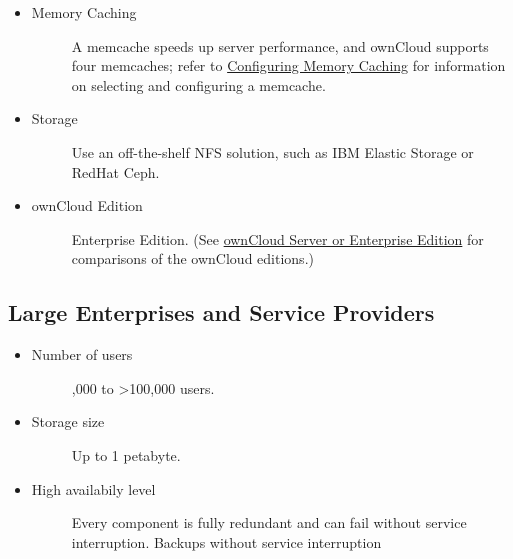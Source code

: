 \documentclass[letterpaper,10pt,english]{sphinxmanual}
\begin{document}
\begin{itemize}
\begin{description}
\end{description}

\item {} \begin{description}
\item[{Memory Caching}] \leavevmode
A memcache speeds up server performance, and ownCloud supports four
memcaches; refer to \href{https://doc.owncloud.org/server/9.0/admin\_manual/configuration\_server/caching\_configuration.html}{Configuring Memory Caching} for information on
selecting and configuring a memcache.

\end{description}

\item {} \begin{description}
\item[{Storage}] \leavevmode
Use an off-the-shelf NFS solution, such as IBM Elastic Storage or RedHat
Ceph.

\end{description}

\item {} \begin{description}
\item[{ownCloud Edition}] \leavevmode
Enterprise Edition. (See \href{https://owncloud.com/owncloud-server-or-enterprise-edition/}{ownCloud Server or Enterprise Edition} for
comparisons of the ownCloud editions.)

\end{description}

\end{itemize}


\subsection{Large Enterprises and Service Providers}
\label{installation/deployment_recommendations:large-enterprises-and-service-providers}\begin{itemize}
\item {} \begin{description}
\item[{Number of users}] ,000 to \textgreater{}100,000 users.

\end{description}

\item {} \begin{description}
\item[{Storage size}] \leavevmode
Up to 1 petabyte.

\end{description}

\item {} \begin{description}
\item[{High availabily level}] \leavevmode
Every component is fully redundant and can fail without service interruption.
Backups without service interruption

\end{description}

\end{itemize}
\end{document}
